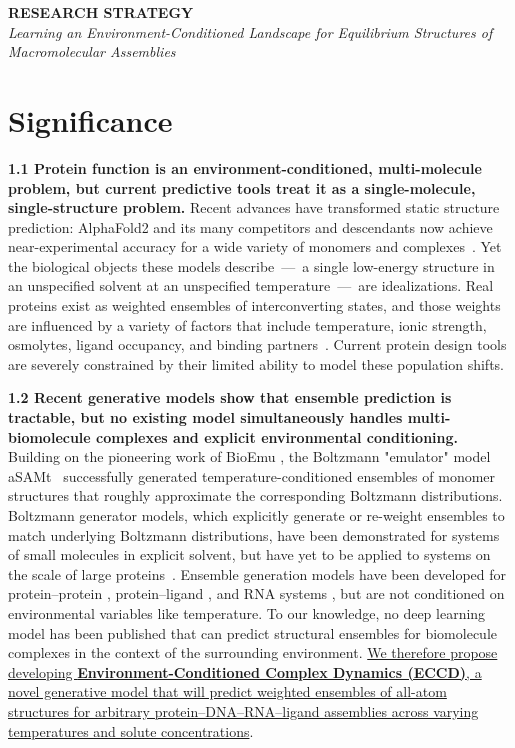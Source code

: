 \documentclass[11pt]{article}
\newcommand{\ECCD}{ECCD\xspace}
\begin{document}
\begin{center}
{\large\bfseries RESEARCH STRATEGY}\\[2pt]
{\small\itshape Learning an Environment-Conditioned Landscape for Equilibrium Structures of Macromolecular Assemblies}
\end{center}

\section{Significance}

\textbf{1.1 Protein function is an environment-conditioned, multi-molecule problem, but current predictive tools treat it as a single-molecule, single-structure problem.} Recent advances have transformed static structure prediction: AlphaFold2 and its many competitors and descendants now achieve near-experimental accuracy for a wide variety of monomers and complexes~\cite{jumper_AlphaFold2_2021,zheng_ESM_2024,abramson_AlphaFold3_2024}. Yet the biological objects these models describe~---~a single low-energy structure in an unspecified solvent at an unspecified temperature~---~are idealizations. Real proteins exist as weighted ensembles of interconverting states, and those weights are influenced by a variety of factors that include temperature, ionic strength, osmolytes, ligand occupancy, and binding partners~\cite{bowman_Introduction_2026,olsson_Generative_2026,janson_Generation_2025}. Current protein design tools are severely constrained by their limited ability to model these population shifts.

\textbf{1.2 Recent generative models show that ensemble prediction is tractable, but no existing model simultaneously handles multi-biomolecule complexes and explicit environmental conditioning.} Building on the pioneering work of BioEmu \cite{lewis_Scalable_2025}, the Boltzmann "emulator" model aSAMt~\cite{janson_Deep_2025a} successfully generated temperature-conditioned ensembles of monomer structures that roughly approximate the corresponding Boltzmann distributions. Boltzmann generator models, which explicitly generate or re-weight ensembles to match underlying Boltzmann distributions, have been demonstrated for systems of small molecules in explicit solvent, but have yet to be applied to systems on the scale of large proteins~\cite{aggarwal_BoltzNCE_2025,gloy_HollowFlow_2025,diez_BOLTZMANN_2025}. Ensemble generation models have been developed for protein--protein \cite{wang_Exploring_2024}, protein--ligand \cite{qiao_Statespecific_2024}, and RNA systems \cite{li_DynaRNA_2025}, but are not conditioned on environmental variables like temperature. To our knowledge, no deep learning model has been published that can predict structural ensembles for biomolecule complexes in the context of the surrounding environment. \uline{We therefore propose developing \textbf{Environment-Conditioned Complex Dynamics (\ECCD)}, a novel generative model that will predict weighted ensembles of all-atom structures for arbitrary protein--DNA--RNA--ligand assemblies across varying temperatures and solute concentrations}.
\end{document}
